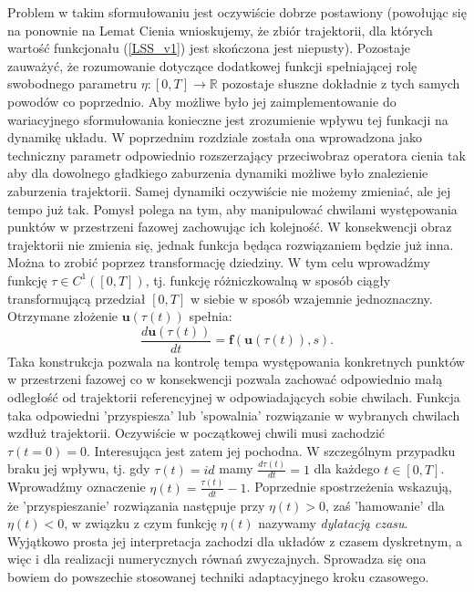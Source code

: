 \documentclass[12pt]{article}
\begin{document}
Problem w takim sformułowaniu jest oczywiście dobrze postawiony (powołując się na ponownie na Lemat Cienia wnioskujemy, że zbiór trajektorii, dla których wartość funkcjonału (\ref{LSS_v1}) jest skończona jest niepusty). Pozostaje zauważyć, że rozumowanie dotyczące dodatkowej funkcji spełniającej rolę swobodnego parametru $ \eta: [0,T] \rightarrow \mathbb{R} $ pozostaje słuszne dokładnie z tych samych powodów co poprzednio. Aby możliwe było jej zaimplementowanie do wariacyjnego sformułowania konieczne jest zrozumienie wpływu tej funkacji na dynamikę układu. W poprzednim rozdziale została ona wprowadzona jako techniczny parametr odpowiednio rozszerzający przeciwobraz operatora cienia tak aby dla dowolnego gładkiego zaburzenia dynamiki możliwe było znalezienie zaburzenia trajektorii. Samej dynamiki oczywiście nie możemy zmieniać, ale jej tempo już tak. Pomysł polega na tym, aby manipulować chwilami występowania punktów w przestrzeni fazowej zachowując ich kolejność. W konsekwencji obraz trajektorii nie zmienia się, jednak funkcja będąca rozwiązaniem będzie już inna. Można to zrobić poprzez transformację dziedziny. W tym celu wprowadźmy funkcję $ \tau \in C^{1}([0,T]) $, tj. funkcję różniczkowalną w sposób ciągły transformującą przedział $ [0,T] $ w siebie w sposób wzajemnie jednoznaczny. Otrzymane złożenie $ \textbf{u}(\tau(t)) $ spełnia:
\begin{equation}
\frac{d\textbf{u}(\tau (t))}{dt} = \textbf{f}(\textbf{u}(\tau(t)), s).
\label{LSS_v2}
\end{equation}  
Taka konstrukcja pozwala na kontrolę tempa występowania konkretnych punktów w przestrzeni fazowej co w konsekwencji pozwala zachować odpowiednio małą odległość od trajektorii referencyjnej w odpowiadających sobie chwilach. \newline
Funkcja taka odpowiedni 'przyspiesza' lub 'spowalnia' rozwiązanie w wybranych chwilach wzdłuż trajektorii. Oczywiście w początkowej chwili musi zachodzić $ \tau(t=0) = 0 $. Interesująca jest zatem jej pochodna. W szczególnym przypadku braku jej wpływu, tj. gdy $ \tau(t) = id $ mamy $ \frac{d\tau(t)}{dt} = 1$ dla każdego $ t \in [0,T] $. Wprowadźmy oznaczenie $ \eta(t) = \frac{\tau(t)}{dt}-1 $. Poprzednie spostrzeżenia wskazują, że 'przyspieszanie' rozwiązania następuje przy $ \eta(t) > 0$, zaś 'hamowanie' dla  $ \eta(t) < 0$, w związku z czym funkcję $ \eta(t) $ nazywamy \textit{dylatacją czasu}.\newline
Wyjątkowo prosta jej interpretacja zachodzi dla układów z czasem dyskretnym, a więc i dla realizacji numerycznych równań zwyczajnych. Sprowadza się ona bowiem do powszechie stosowanej techniki adaptacyjnego kroku czasowego.
\end{document}
